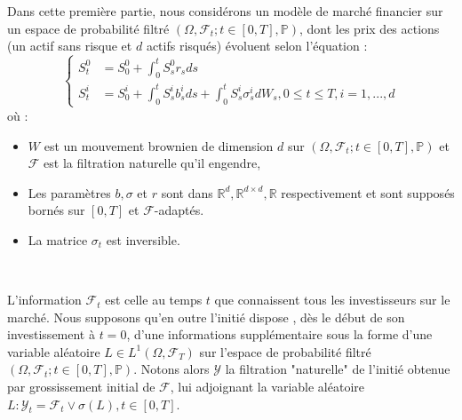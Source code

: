 Dans cette première partie, nous considérons un modèle de marché financier sur un espace de probabilité filtré $(\Omega, \mathcal{F}_t; t \in [0,T], \mathbb{P})$, dont les prix des actions (un actif sans risque et $d$ actifs risqués) évoluent selon l'équation : 
\begin{equation}
\begin{cases}
S^0_t &= S_0^0 + \int_{0}^{t} S^0_s r_s ds \\
\displaystyle S_t^i &= S_0^i + \int_{0}^{t} S_s^i b_s^i ds +  \int_{0}^{t} S_s^i \sigma_s^i dW_s, 0\leq t \leq T, i = 1,...,d
\end{cases}
\end{equation}
où : \\

\begin{itemize}
\item $W$ est un mouvement brownien de dimension $d$ sur $(\Omega, \mathcal{F}_t; t \in [0,T], \mathbb{P})$ et $\mathcal{F}$ est la filtration naturelle qu'il engendre,
\item Les paramètres $b, \sigma$ et $r$ sont dans $\mathbb{R}^d, \mathbb{R}^{d\times d}, \mathbb{R}$ respectivement et sont supposés bornés sur $[0,T]$ et $\mathcal{F}$-adaptés.
\item La matrice $\sigma_t$ est inversible.
\end{itemize}
\

L'information $\mathcal{F}_t$ est celle au temps $t$ que connaissent tous les investisseurs sur le marché.
Nous supposons qu'en outre l'initié dispose , dès le début de son investissement à $t=0$, d'une informations supplémentaire sous la forme d'une variable aléatoire $L \in L^1(\Omega, \mathcal{F}_T)$ sur l'espace de probabilité filtré $(\Omega, \mathcal{F}_t; t \in [0,T], \mathbb{P})$. 
Notons alors $\mathcal{Y}$ la filtration "naturelle" de l'initié obtenue par grossissement initial de $\mathcal{F}$, lui adjoignant la variable aléatoire $L : \mathcal{Y}_t = \mathcal{F}_t \vee \sigma(L), t \in [0, T]$.\\

